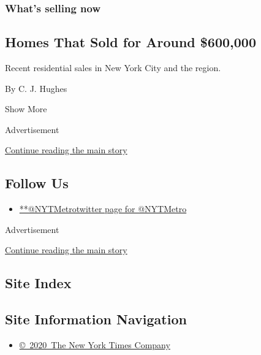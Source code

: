 \begin{enumerate}
  \hypertarget{whats-selling-now}{%
  \subsubsection{What's selling now}\label{whats-selling-now}}

  \hypertarget{homes-that-sold-for-around-600000}{%
  \subsection{Homes That Sold for Around
  \$600,000}\label{homes-that-sold-for-around-600000}}

  Recent residential sales in New York City and the region.

  By C. J. Hughes
\end{enumerate}

Show More

Advertisement

\protect\hyperlink{after-mid2}{Continue reading the main story}

\hypertarget{follow-us}{%
\subsection{Follow Us}\label{follow-us}}

\begin{itemize}
\tightlist
\item
  \href{https://twitter.com/NYTMetro}{**@NYTMetrotwitter page for
  @NYTMetro}
\end{itemize}

Advertisement

\protect\hyperlink{after-mktg}{Continue reading the main story}

\hypertarget{site-index}{%
\subsection{Site Index}\label{site-index}}

\hypertarget{site-information-navigation}{%
\subsection{Site Information
Navigation}\label{site-information-navigation}}

\begin{itemize}
\tightlist
\item
  \href{https://help.nytimes3xbfgragh.onion/hc/en-us/articles/115014792127-Copyright-notice}{©~2020~The
  New York Times Company}
\end{itemize}

